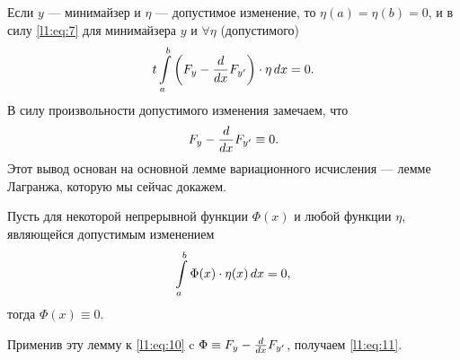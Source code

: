 Если $y$ --- минимайзер и $\eta$ --- допустимое изменение, то $\eta(a)=\eta(b)=0$, и в силу \eqref{l1:eq:7} для минимайзера $y$ и $\forall\eta$  (допустимого)
\begin{equation}
	\label{l1:eq:10}
	\hfill t\int\limits_a^b\left(F_y-\der{}{x}F_{y'}\right)\cdot\eta\,\dd{x}=0.\hfill
\end{equation}
В силу произвольности допустимого изменения замечаем, что 
\begin{equation}
	\label{l1:eq:11}
	\hfill F_y-\der{}{x}F_{y'}\equiv0.\hfill
\end{equation}
Этот вывод основан на основной лемме вариационного исчисления --- лемме Лагранжа, которую мы сейчас докажем.
\begin{_lemm}[Лагранжа]
	Пусть для некоторой непрерывной функции $\Phi(x)$ и любой функции $\eta$, являющейся допустимым изменением
	\begin{equation}
		\label{l1:eq:12}
		\hfill\int\limits_a^b \Phi(x)\cdot\eta(x)\,\dd{x}=0,\hfill
	\end{equation}
	тогда $\Phi(x)\equiv0$.
\end{_lemm}
\noindent Применив эту лемму к \eqref{l1:eq:10} c $\Phi\equiv F_y-\frac{d}{dx}F_{y'}$, получаем \eqref{l1:eq:11}.
